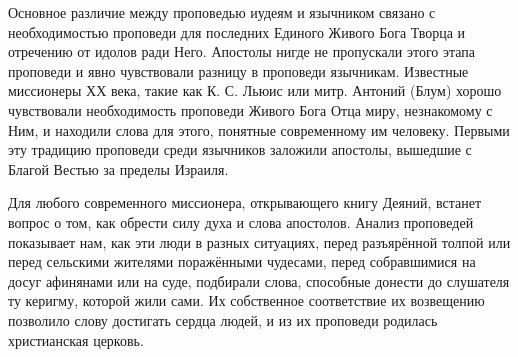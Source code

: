 Основное различие между проповедью иудеям и язычником связано с необходимостью проповеди для последних Единого Живого Бога Творца и отречению от идолов ради Него.
Апостолы нигде не пропускали этого этапа проповеди и явно чувствовали разницу в проповеди язычникам.
Известные миссионеры ХХ века, такие как К. С. Льюис или митр. Антоний (Блум) хорошо чувствовали необходимость проповеди Живого Бога Отца миру, незнакомому с Ним, и находили слова для этого, понятные современному им человеку.
Первыми эту традицию проповеди среди язычников заложили апостолы, вышедшие с Благой Вестью за пределы Израиля.


Для любого современного миссионера, открывающего книгу Деяний, встанет вопрос о том, как обрести силу духа и слова апостолов.
Анализ проповедей показывает нам, как эти люди в разных ситуациях, перед разъярённой толпой или перед сельскими жителями поражёнными чудесами, перед собравшимися на досуг афинянами или на суде, подбирали слова, способные донести до слушателя ту керигму, которой жили сами.
Их собственное соответствие их возвещению позволило слову достигать сердца людей, и из их проповеди родилась христианская церковь.


